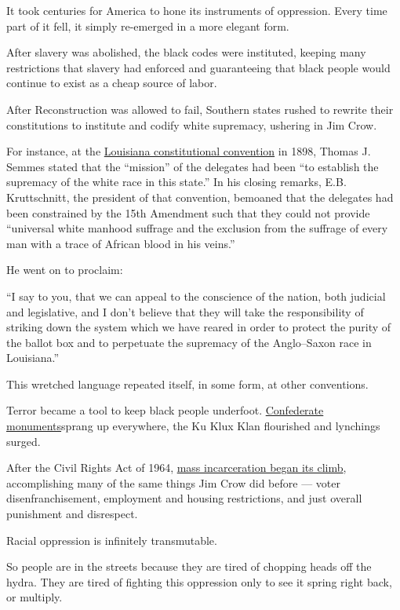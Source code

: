 It took centuries for America to hone its instruments of oppression.
Every time part of it fell, it simply re-emerged in a more elegant form.

After slavery was abolished, the black codes were instituted, keeping
many restrictions that slavery had enforced and guaranteeing that black
people would continue to exist as a cheap source of labor.

After Reconstruction was allowed to fail, Southern states rushed to
rewrite their constitutions to institute and codify white supremacy,
ushering in Jim Crow.

For instance, at the
\href{https://www.demos.org/blog/overcoming-white-supremacy-louisiana}{Louisiana
constitutional convention} in 1898, Thomas J. Semmes stated that the
``mission'' of the delegates had been ``to establish the supremacy of
the white race in this state.'' In his closing remarks, E.B.
Kruttschnitt, the president of that convention, bemoaned that the
delegates had been constrained by the 15th Amendment such that they
could not provide ``universal white manhood suffrage and the exclusion
from the suffrage of every man with a trace of African blood in his
veins.''

He went on to proclaim:

``I say to you, that we can appeal to the conscience of the nation, both
judicial and legislative, and I don't believe that they will take the
responsibility of striking down the system which we have reared in order
to protect the purity of the ballot box and to perpetuate the supremacy
of the Anglo--Saxon race in Louisiana.''

This wretched language repeated itself, in some form, at other
conventions.

Terror became a tool to keep black people underfoot.
\href{https://www.vox.com/identities/2017/8/15/16153220/trump-confederate-statues}{Confederate
monuments}sprang up everywhere, the Ku Klux Klan flourished and
lynchings surged.

After the Civil Rights Act of 1964,
\href{https://www.vox.com/2015/7/13/8913297/mass-incarceration-maps-charts}{mass
incarceration began its climb}, accomplishing many of the same things
Jim Crow did before --- voter disenfranchisement, employment and housing
restrictions, and just overall punishment and disrespect.

Racial oppression is infinitely transmutable.

So people are in the streets because they are tired of chopping heads
off the hydra. They are tired of fighting this oppression only to see it
spring right back, or multiply.

